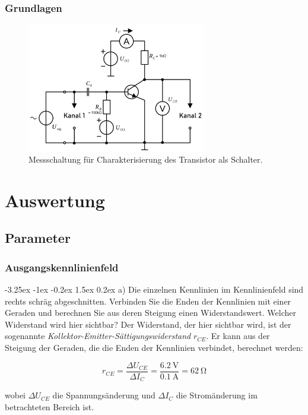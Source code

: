 \documentclass[
	a4paper, %
	12pt, %
]{CSUniSchoolLabReport}
\makeatletter
\renewcommand\paragraph{\@startsection{paragraph}{4}{\z@}%
  {-3.25ex \@plus -1ex \@minus -0.2ex}%
  {1.5ex \@plus 0.2ex}%
  {\normalfont\normalsize\bfseries}}
\makeatother
\begin{document}
\subsubsection{Grundlagen}
\begin{figure}[H]
	\centering
	\includegraphics[width=0.7\textwidth]{Figures/Messschaltung B.2.1..png}
	\caption{Messschaltung für Charakterisierung des Transistor als Schalter.}
	\label{fig:Messschaltung B.2.1.}
\end{figure}

\section{Auswertung}
\subsection{Parameter}
\subsubsection{Ausgangskennlinienfeld}
\paragraph{a) Die einzelnen Kennlinien im Kennlinienfeld sind rechts schräg abgeschnitten. Verbinden Sie die Enden der Kennlinien mit einer Geraden und berechnen Sie aus deren Steigung einen Widerstandswert. Welcher Widerstand wird hier sichtbar?}
Der Widerstand, der hier sichtbar wird, ist der sogenannte \emph{Kollektor-Emitter-Sättigungswiderstand} $r_{CE}$. Er kann aus der Steigung der Geraden, die die Enden der Kennlinien verbindet, berechnet werden:

\[
r_{CE} = \frac{\Delta U_{CE}}{\Delta I_C} = \frac{\SI{6.2}{\volt}}{\SI{0.1}{\ampere}} = \SI{62}{\ohm}
\]

wobei $\Delta U_{CE}$ die Spannungsänderung und $\Delta I_C$ die Stromänderung im betrachteten Bereich ist.
\end{document}
